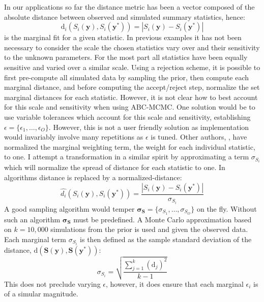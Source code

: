 In our applications so far the distance metric has been a vector composed of the absolute distance between observed and simulated summary statistics, hence:
\begin{equation}
\text{d}_i(S_i(\bm{y}),S_i(\bm{y^*})) = |S_i(\bm{y})-S_i(\bm{y^*})|
\label{marginal_distance}
\end{equation}
is the marginal fit for a given statistic. In previous examples it has not been necessary to consider the scale the chosen statistics vary over and their sensitivity to the unknown parameters. For the most part all statistics have been equally sensitive and varied over a similar scale. Using a rejection scheme, it is possible to first pre-compute all simulated data by sampling the prior, then compute each marginal distance, and before computing the accept/reject step, normalize the set marginal distances for each statistic. However, it is not clear how to best account for this scale and sensitivity when using ABC-MCMC. One solution would be to use variable tolerances which account for this scale and sensitivity, establishing $\epsilon = \{\epsilon_1,\dots,\epsilon_O\}$. However, this is not a user friendly solution as implementation would invariably involve many repetitions as $\epsilon$ is tuned. Other authors, \citet{Ratmann2010}, have normalized the marginal weighting term, the weight for each individual statistic, to one. I attempt a transformation in a similar spirit by approximating a term $\sigma_{S_i}$ which will normalize the spread of distance for each statistic to one. In algorithms distance is replaced by a normalized-distance:
\begin{equation}
\hat{d_i}(S_i(\bm{y}),S_i(\bm{y^*})) =  \frac{|S_i(\bm{y})-S_i(\bm{y^*})|}{\sigma_{S_i}}
\end{equation}
A good sampling algorithm would temper $\bm{\sigma_S} = \{\sigma_{S_1},\dots,\sigma_{S_O}\}$ on the fly. Without such an algorithm $\bm{\sigma_S}$ must be predefined. A Monte Carlo approximation based on $k = 10,000$ simulations from the prior is used and given the observed data. Each marginal term $\sigma_{S_i}$ is then defined as the sample standard deviation of the distance, $\text{d}(\bm{S}(\bm{y}),\bm{S}(\bm{y^*}))$:
\begin{equation}
\sigma_{S_i} = \sqrt{\frac{\sum_{j = 1}^{k}(\text{d}_j)^2}{k-1}}
\end{equation}
This does not preclude varying $\epsilon$, however, it does ensure that each marginal $\epsilon_i$ is of a simular magnitude. \par

